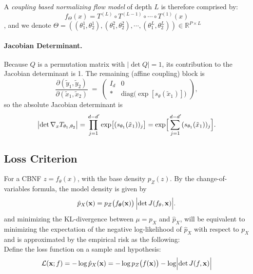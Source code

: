 \documentclass[11pt, a4paper]{article}
\theoremstyle{definition}
\theoremstyle{remark}
\newcommand{\R}{\mathbb{R}}
\begin{document}
	
	A \textit{coupling based normalizing flow model} of depth \(L\) is therefore comprised by:
	\[
	f_{\Theta}(x) = T^{(L)} \circ  T^{(L-1)} \circ \cdots \circ  T^{(1)} (x) 
	 \]
	 , and we denote \(\Theta = ((\theta_1^1 , \theta_2^1), (\theta_1^2 , \theta_2^2) , \cdots ,(\theta_1^L , \theta_2^L)) \in \R^{P \times L} \)
	
	\paragraph{Jacobian Determinant.}
	Because $Q$ is a permutation matrix with $\lvert \det Q \rvert = 1$, its contribution to the Jacobian determinant is 1.
	The remaining (affine coupling) block is
	\[
	\frac{\partial (\tilde{y}_1, \tilde{y}_2)}{\partial (\tilde{x}_1, \tilde{x}_2)}
	\;=\;
	\begin{pmatrix}
		I_{d} & 0 \\
		* & \mathrm{diag}\!\bigl(\exp[s_\theta(\tilde{x}_1)]\bigr)
	\end{pmatrix},
	\]
	so the absolute Jacobian determinant is
	\begin{equation} \label{eq:jacobian-determinant}
	\bigl|\det \nabla_x T_{\theta_1,\theta_2}\bigr|
	=
	\prod_{j=1}^{\,d-d'} \exp\bigl[(s_{\theta_1}(\tilde{x}_1))_j\bigr]
	=
	\exp \Bigl[\sum_{j=1}^{\,d-d'} (s_{\theta_1}(\tilde{x}_1))_j\Bigr].
	\end{equation}
	\subsection{Loss Criterion}
	For a CBNF \(z = f_{\theta}(x)\),
	with the base density \( p_Z(z) \). By the change-of-variables formula, the model density is given by
	\[
	\hat{p}_X(\mathbf{x}) = p_Z\bigl(f_{\boldsymbol{\theta}}(\mathbf{x})\bigr) \, \Bigl|\det J(f_\theta,\mathbf{x}) \Bigr|.
	\]
	and minimizing the KL-divergence between \(\mu=p_X\) and \(\hat{p}_X\), will be equivalent to minimizing the expectation of the negative log-likelihood of \(\hat{p}_X\) with respect to \(p_X\) and is approximated by the empirical risk as the following:\\
	Define the loss function on a sample and hypothesis:
	\[
	\mathcal{L}(\mathbf{x}; f) = -\log\hat{p}_X(\mathbf{x}) = -\log p_Z\bigl(f(\mathbf{x})\bigr) - \log \Bigl|\det J(f,\mathbf{x}) \Bigr|
	\]
	
	
%	
%	
	
\end{document}
